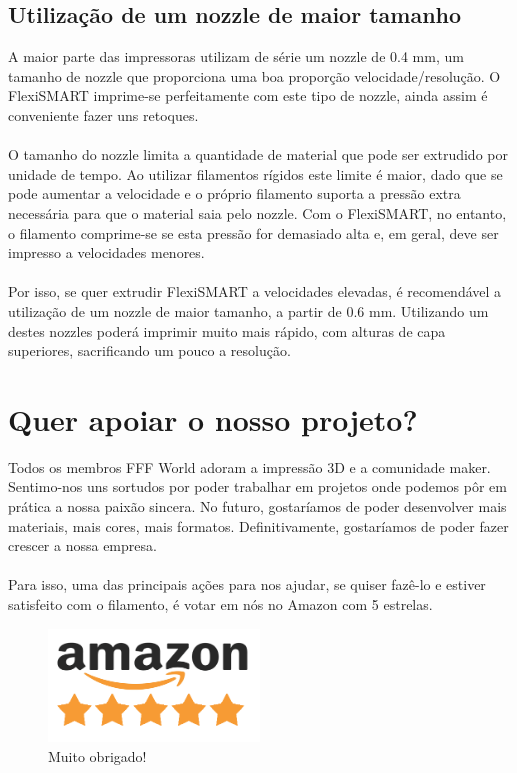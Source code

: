 \documentclass[11pt,a4paper]{article}
\begin{document}
	\subsection{Utilização de um nozzle de maior tamanho}
A maior parte das impressoras utilizam de série um nozzle de 0.4 mm, um tamanho de nozzle que proporciona uma boa proporção velocidade/resolução. O FlexiSMART imprime-se perfeitamente com este tipo de nozzle, ainda assim é conveniente fazer uns retoques.
\\\\
O tamanho do nozzle limita a quantidade de material que pode ser extrudido por unidade de tempo. Ao utilizar filamentos rígidos este limite é maior, dado que se pode aumentar a velocidade e o próprio filamento suporta a pressão extra necessária para que o material saia pelo nozzle. Com o FlexiSMART, no entanto, o filamento comprime-se se esta pressão for demasiado alta e, em geral, deve ser impresso a velocidades menores.
\\\\
Por isso, se quer extrudir FlexiSMART a velocidades elevadas, é recomendável a utilização de um nozzle de maior tamanho, a partir de 0.6 mm. Utilizando um destes nozzles poderá imprimir muito mais rápido, com alturas de capa superiores, sacrificando um pouco a resolução.
\section{Quer apoiar o nosso projeto?}
Todos os membros FFF World adoram a impressão 3D e a comunidade maker. Sentimo-nos uns sortudos por poder trabalhar em projetos onde podemos pôr em prática a nossa paixão sincera. No futuro, gostaríamos de poder desenvolver mais materiais, mais cores, mais formatos. Definitivamente, gostaríamos de poder fazer crescer a nossa empresa.
\\\\
Para isso, uma das principais ações para nos ajudar, se quiser fazê-lo e estiver satisfeito com o filamento, é votar em nós no Amazon com 5 estrelas.
\begin{figure}[H]
\centering
\includegraphics[width=0.5\textwidth,cfbox=azul_marcos 1pt 0pt]{FOTOS/AMAZON_FIVE_STARS}
\caption*{Muito obrigado!}
\end{figure}
\end{document}
